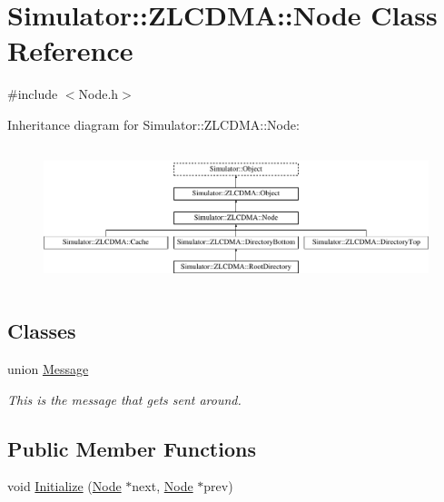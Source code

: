 \hypertarget{class_simulator_1_1_z_l_c_d_m_a_1_1_node}{\section{Simulator\+:\+:Z\+L\+C\+D\+M\+A\+:\+:Node Class Reference}
\label{class_simulator_1_1_z_l_c_d_m_a_1_1_node}
}


{\ttfamily \#include $<$Node.\+h$>$}

Inheritance diagram for Simulator\+:\+:Z\+L\+C\+D\+M\+A\+:\+:Node\+:\begin{figure}[H]
\begin{center}
\leavevmode
\includegraphics[height=4.093567cm]{class_simulator_1_1_z_l_c_d_m_a_1_1_node}
\end{center}
\end{figure}
\subsection*{Classes}
\begin{DoxyCompactItemize}
\item 
union \hyperlink{union_simulator_1_1_z_l_c_d_m_a_1_1_node_1_1_message}{Message}
\begin{DoxyCompactList}\small\item\em This is the message that gets sent around. \end{DoxyCompactList}\end{DoxyCompactItemize}
\subsection*{Public Member Functions}
\begin{DoxyCompactItemize}
\item 
void \hyperlink{class_simulator_1_1_z_l_c_d_m_a_1_1_node_aa463143bc67281a1e4c2d00f6351850a}{Initialize} (\hyperlink{class_simulator_1_1_z_l_c_d_m_a_1_1_node}{Node} $\ast$next, \hyperlink{class_simulator_1_1_z_l_c_d_m_a_1_1_node}{Node} $\ast$prev)
\end{DoxyCompactItemize}
